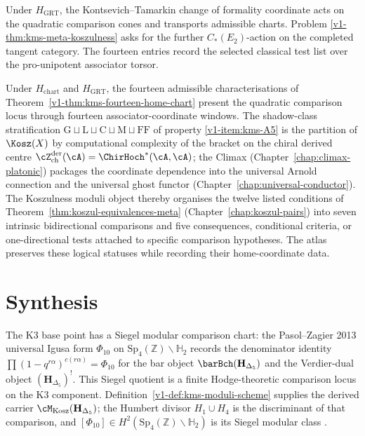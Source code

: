 Under $H_{\mathrm{GRT}}$, the Kontsevich--Tamarkin change of
formality coordinate acts on the quadratic comparison cones and
transports admissible charts.  Problem
\ref{v1-thm:kms-meta-koszulness} asks for the further
$C_*(E_2)$-action on the completed tangent category.  The fourteen
entries record the selected classical test list over the
pro-unipotent associator torsor.

\begin{remark}
\label{v1-rem:kms-koszul-reflection-bridge}
Under $H_{\mathrm{chart}}$ and $H_{\mathrm{GRT}}$, the fourteen
admissible characterisations of
Theorem~\ref{v1-thm:kms-fourteen-home-chart} present the quadratic
comparison locus through fourteen associator-coordinate windows. The
shadow-class stratification
$\mathrm{G}\sqcup\mathrm{L}\sqcup\mathrm{C}\sqcup\mathrm{M}\sqcup\mathrm{FF}$
of property \ref{v1-item:kms-A5} is the partition of $\Kosz(X)$
by computational complexity of the bracket on the chiral derived
centre
$\cZ^{\mathrm{der}}_{\mathrm{ch}}(\cA)=\ChirHoch^*(\cA,\cA)$;
the Climax (Chapter~\ref{chap:climax-platonic}) packages the
coordinate dependence into the universal Arnold connection and the
universal ghost functor (Chapter~\ref{chap:universal-conductor}).
The Koszulness moduli object thereby organises the twelve listed
conditions of
Theorem~\textup{\ref{thm:koszul-equivalences-meta}} (Chapter~\textup{\ref{chap:koszul-pairs}})
into seven intrinsic bidirectional comparisons and five consequences,
conditional criteria, or one-directional tests attached to
specific comparison hypotheses. The atlas preserves these logical
statuses while recording their home-coordinate data.
\end{remark}


\section{Synthesis}
\label{sec:kms-supplement}

\begin{remark}
\label{rem:kms-1}
The K3 base point has a Siegel modular comparison chart: the
Pasol--Zagier 2013 universal Igusa form $\Phi_{10}$ on
$\mathrm{Sp}_4(\mathbb Z)\backslash\mathbb H_2$ records the
denominator identity
$\prod(1-q^{r\alpha})^{c(r\alpha)}=\Phi_{10}$ for the
bar object $\barBch(\mathbf H_{\Delta_5})$ and the Verdier-dual
object $(\mathbf H_{\Delta_5})^!$. This Siegel quotient is a finite
Hodge-theoretic comparison locus on the K3 component.
Definition~\ref{v1-def:kms-moduli-scheme} supplies the derived
carrier $\cM_{\mathrm{Kosz}}(\mathbf H_{\Delta_5})$; the
Humbert divisor $H_1\cup H_4$ is the discriminant of that
comparison, and
$[\Phi_{10}]\in H^2(\mathrm{Sp}_4(\mathbb Z)\backslash\mathbb H_2)$
is its Siegel modular class
\cite{PasolZagier2013,GritsenkoNikulin1998}.
\end{remark}


